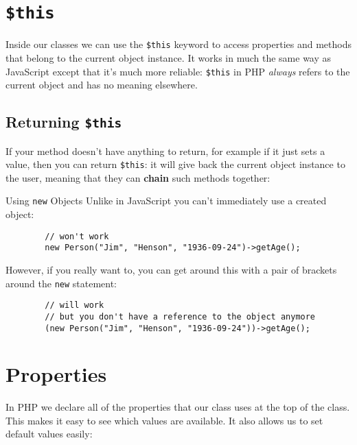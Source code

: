 \section{\texttt{\$this}}

Inside our classes we can use the \texttt{\$this} keyword to access properties and methods that belong to the current object instance. It works in much the same way as JavaScript except that it's much more reliable: \texttt{\$this} in PHP \textit{always} refers to the current object and has no meaning elsewhere.



\subsection{Returning \texttt{\$this}}

If your method doesn't have anything to return, for example if it just sets a value, then you can return \texttt{\$this}: it will give back the current object instance to the user, meaning that they can \textbf{chain} such methods together:



\begin{infobox}{Using \texttt{new} Objects}
    Unlike in JavaScript you can't immediately use a created object:

    \begin{verbatim}
        // won't work
        new Person("Jim", "Henson", "1936-09-24")->getAge();
    \end{verbatim}

    However, if you really want to, you can get around this with a pair of brackets around the \texttt{new} statement:

    \begin{verbatim}
        // will work
        // but you don't have a reference to the object anymore
        (new Person("Jim", "Henson", "1936-09-24"))->getAge();
    \end{verbatim}
\end{infobox}




\section{Properties}

In PHP we declare all of the properties that our class uses at the top of the class. This makes it easy to see which values are available. It also allows us to set default values easily:

